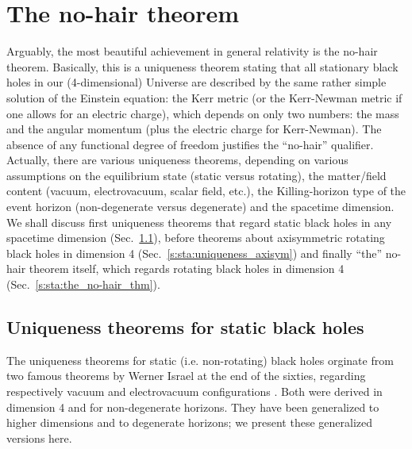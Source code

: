 
\section{The no-hair theorem} \label{s:sta:no-hair}

Arguably, the most beautiful achievement in general relativity is the
no-hair theorem.
Basically, this is a uniqueness theorem stating that all stationary black holes in our (4-dimensional) Universe are
described by the same rather simple solution of the Einstein equation: the Kerr metric
(or the Kerr-Newman metric if one allows for an electric charge), which depends on only
two numbers: the mass and the angular momentum (plus the electric charge for Kerr-Newman).
The absence of any functional degree of freedom justifies the ``no-hair'' qualifier.
Actually, there are various uniqueness theorems, depending on various assumptions
on the equilibrium state (static versus rotating),
the matter/field content (vacuum, electrovacuum, scalar field, etc.),
the Killing-horizon type of the event horizon (non-degenerate versus degenerate) and the spacetime
dimension. We shall discuss first uniqueness theorems that regard static black holes
in any spacetime dimension (Sec.~\ref{s:sta:uniqueness_static}), before
theorems about axisymmetric rotating black holes in dimension 4 (Sec.~\ref{s:sta:uniqueness_axisym})
and finally ``the'' no-hair theorem itself, which regards rotating black holes in dimension 4
(Sec.~\ref{s:sta:the_no-hair_thm}).

\subsection{Uniqueness theorems for static black holes} \label{s:sta:uniqueness_static}

The uniqueness theorems for static (i.e. non-rotating) black holes orginate from
two famous theorems by Werner Israel at the end of the sixties,
regarding respectively vacuum \cite{Israe67}
and electrovacuum configurations \cite{Israe68}. Both were derived in dimension 4
and for non-degenerate horizons. They have been generalized to higher dimensions
and to degenerate horizons; we present these generalized versions here.

